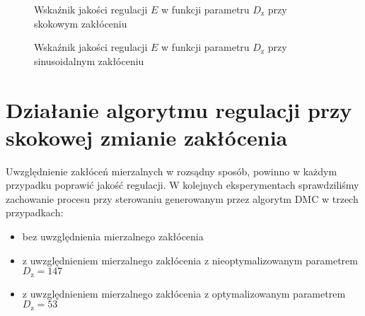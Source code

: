 \begin{figure}[t]
    \centering
    \caption{Wskaźnik jakości regulacji $E$ w funkcji parametru $D_{\mathrm{z}}$ przy skokowym zakłóceniu}
    \label{zad5_dz_skok_wynik}
\end{figure}

\begin{figure}[b]
    \centering
    \caption{Wskaźnik jakości regulacji $E$ w funkcji parametru $D_{\mathrm{z}}$ przy sinusoidalnym zakłóceniu}
    \label{zad5_dz_sin_wynik}
\end{figure}
\FloatBarrier

\section{Działanie algorytmu regulacji przy skokowej zmianie zakłócenia}
\label{zad5_step_dist}
Uwzględnienie zakłóceń mierzalnych w rozsądny sposób, powinno w każdym przypadku 
poprawić jakość regulacji. W kolejnych eksperymentach sprawdziliśmy zachowanie procesu
przy sterowaniu generowanym przez algorytm DMC w trzech przypadkach:

\begin{itemize}
    \item bez uwzględnienia mierzalnego zakłócenia
    \item z uwzględnieniem mierzalnego zakłócenia z nieoptymalizowanym parametrem $D_{\mathrm{z}} = \num{147}$
    \item z uwzględnieniem mierzalnego zakłócenia z optymalizowanym parametrem $D_{\mathrm{z}} = \num{53}$
\end{itemize}

